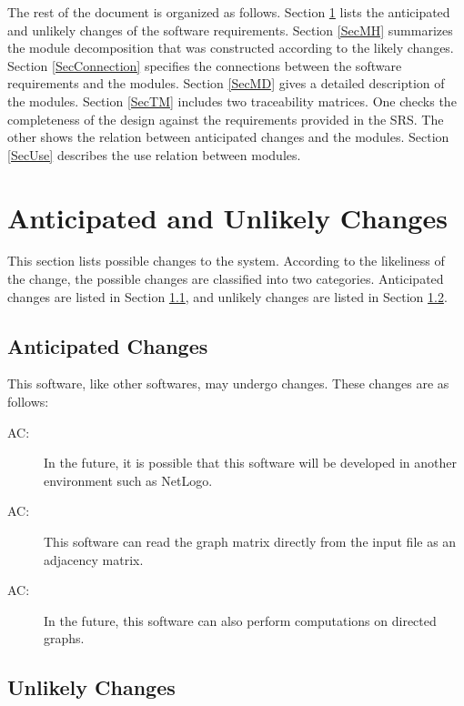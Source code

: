 \documentclass[12pt, titlepage]{article}
\newcounter{acnum}
\newcommand{\actheacnum}{AC\theacnum}
\begin{document}
The rest of the document is organized as follows. Section
\ref{SecChange} lists the anticipated and unlikely changes of the software
requirements. Section \ref{SecMH} summarizes the module decomposition that
was constructed according to the likely changes. Section \ref{SecConnection}
specifies the connections between the software requirements and the
modules. Section \ref{SecMD} gives a detailed description of the
modules. Section \ref{SecTM} includes two traceability matrices. One checks
the completeness of the design against the requirements provided in the SRS. The
other shows the relation between anticipated changes and the modules. Section
\ref{SecUse} describes the use relation between modules.

\section{Anticipated and Unlikely Changes} \label{SecChange}

This section lists possible changes to the system. According to the likeliness
of the change, the possible changes are classified into two
categories. Anticipated changes are listed in Section \ref{SecAchange}, and
unlikely changes are listed in Section \ref{SecUchange}.

\subsection{Anticipated Changes} \label{SecAchange}

This software, like other softwares, may undergo changes. These changes are as follows:

\begin{description}
\item[ \actheacnum \label{acHardware}:] In the future, it is possible that this software will be developed in another environment such as NetLogo.
\item[ \actheacnum \label{acInput}:] This software can read the graph matrix directly from the input file as an adjacency matrix.
\item[ \actheacnum \label{computation}:]  In the future, this software can also perform computations on directed graphs.
\end{description}

\subsection{Unlikely Changes} \label{SecUchange}
\end{document}
